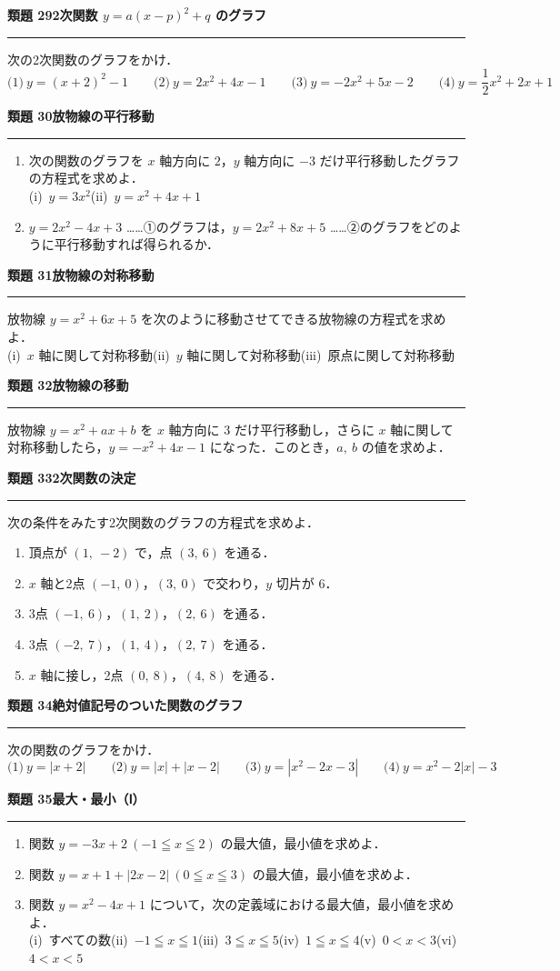 \documentclass[a4paper,11pt]{ltjsarticle}
\newcommand{\mon}[2]{\Needspace{7\baselineskip}\vspace{10pt}%
  {\sffamily\bfseries 類題 #1\quad #2\par}\vspace{2pt}\hrule\vspace{4pt}}
\begin{document}
\mon{29}{2次関数 $y=a(x-p)^2+q$ のグラフ}
次の2次関数のグラフをかけ．
\[\text{(1)}\ y=(x+2)^2-1\qquad\text{(2)}\ y=2x^2+4x-1\qquad\text{(3)}\ y=-2x^2+5x-2\qquad\text{(4)}\ y=\frac12x^2+2x+1\]

\mon{30}{放物線の平行移動}
\begin{enumerate}
\item 次の関数のグラフを $x$ 軸方向に $2$，$y$ 軸方向に $-3$ だけ平行移動したグラフの方程式を求めよ．\\
(i)\ $y=3x^2$\qquad (ii)\ $y=x^2+4x+1$
\item $y=2x^2-4x+3$ ……①のグラフは，$y=2x^2+8x+5$ ……②のグラフをどのように平行移動すれば得られるか．
\end{enumerate}

\mon{31}{放物線の対称移動}
放物線 $y=x^2+6x+5$ を次のように移動させてできる放物線の方程式を求めよ．\\
(i)\ $x$ 軸に関して対称移動\qquad (ii)\ $y$ 軸に関して対称移動\qquad (iii)\ 原点に関して対称移動

\mon{32}{放物線の移動}
放物線 $y=x^2+ax+b$ を $x$ 軸方向に $3$ だけ平行移動し，さらに $x$ 軸に関して対称移動したら，$y=-x^2+4x-1$ になった．このとき，$a,\ b$ の値を求めよ．

\mon{33}{2次関数の決定}
次の条件をみたす2次関数のグラフの方程式を求めよ．
\begin{enumerate}
\item 頂点が $(1,\ -2)$ で，点 $(3,\ 6)$ を通る．
\item $x$ 軸と2点 $(-1,\ 0)$，$(3,\ 0)$ で交わり，$y$ 切片が $6$．
\item 3点 $(-1,\ 6)$，$(1,\ 2)$，$(2,\ 6)$ を通る．
\item 3点 $(-2,\ 7)$，$(1,\ 4)$，$(2,\ 7)$ を通る．
\item $x$ 軸に接し，2点 $(0,\ 8)$，$(4,\ 8)$ を通る．
\end{enumerate}

\mon{34}{絶対値記号のついた関数のグラフ}
次の関数のグラフをかけ．
\[\text{(1)}\ y=|x+2|\qquad\text{(2)}\ y=|x|+|x-2|\qquad\text{(3)}\ y=|x^2-2x-3|\qquad\text{(4)}\ y=x^2-2|x|-3\]

\mon{35}{最大・最小（Ⅰ）}
\begin{enumerate}
\item 関数 $y=-3x+2\ (-1\leqq x\leqq2)$ の最大値，最小値を求めよ．
\item 関数 $y=x+1+|2x-2|\ (0\leqq x\leqq3)$ の最大値，最小値を求めよ．
\item 関数 $y=x^2-4x+1$ について，次の定義域における最大値，最小値を求めよ．\\
(i)\ すべての数\quad (ii)\ $-1\leqq x\leqq1$\quad (iii)\ $3\leqq x\leqq5$\quad (iv)\ $1\leqq x\leqq4$\quad (v)\ $0<x<3$\quad (vi)\ $4<x<5$
\end{enumerate}
\end{document}
